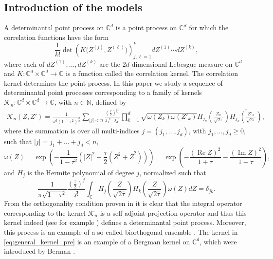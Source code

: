 \documentclass[%
 jmp,
cp,  %
 amsmath,amsthm,amssymb,%
 reprint,%
onecolumn]{revtex4-2}
\renewcommand{\Re}{\operatorname{Re}}
\renewcommand{\Im}{\operatorname{Im}}
\begin{document}
\subsection{Introduction of the models}
A determinantal point process on $\mathbb C^d$ is a point process on $\mathbb C^d$  for which the correlation functions have the form 
$$
    \frac{1}{k!} \det \left(K(Z^{(j)},{Z^{(\ell)})} \right)_{j,\ell=1}^{k} dZ^{(1)} \cdots d Z^{(k)},
$$
where each of $d Z^{(1)}, \ldots, d Z^{(k)}$ are the $2d$ dimensional Lebesgue measure on $\mathbb C^d$ and $K: \mathbb C^d \times \mathbb C^d \to \mathbb C$ is a function called the correlation kernel. The correlation kernel determines the point process.  
In this paper we study a sequence of determinantal point processes corresponding to a family of kernels $\mathcal K_n: \mathbb C^d \times \mathbb C^d \to \mathbb C$, with $n \in \mathbb N$, defined by  
\begin{align} \label{eq:general_kernel_pre}
\mathcal K_n(Z,Z') = \frac{1}{\pi^d (1-\tau^2)^\frac{d}{2}} \sum_{\lvert j\rvert < n} \frac{\left(\frac{\tau}{2}\right)^{\lvert j\rvert}}{j_1!\cdots j_d!} \prod_{k=1}^d \sqrt{\omega(Z_{k}) \omega(Z'_{k})} H_{j_k} \left({\frac{Z_{k}}{\sqrt{2 \tau}}} \right)\overline{ H_{j_k}\left({\frac{Z'_{k}}{\sqrt{2 \tau}}} \right)},
\end{align}
where the summation is over all multi-indices $j=(j_1,\ldots,j_d)$, with $j_1, \ldots, j_d\geq 0$, such that $\lvert j \rvert = j_1+\ldots+j_d<n$,
\begin{equation}
    \omega(Z) = \exp\left(-\frac{1}{1-\tau^2} \left(|Z|^2-\frac{\tau}{2} (Z^2+\overline Z ^2)\right)\right)= \exp\left(-\frac{(\Re Z)^2}{1+\tau}-\frac{(\Im Z)^2}{1-\tau} \right),
\end{equation}
and $H_j$ is the Hermite polynomial of degree $j$, normalized such that 
\begin{equation} \label{eq:defHermitePolyNormalization}
    \frac{1}{\pi \sqrt{1-\tau^2}}\frac{\left(\frac{\tau}{2}\right)^j}{j!} \int_{\mathbb C} H_j \left({\frac{Z}{\sqrt{2 \tau}}}  \right) \overline{H_k\left({\frac{Z}{\sqrt{2 \tau}}} \right)}  \omega(Z) dZ = \delta_{jk}.
\end{equation}
From the orthogonality condition 
proven in \cite{EvM,PdF}
it is clear that the integral operator corresponding to the kernel $\mathcal K_n$ is a self-adjoint projection operator and thus this  kernel indeed (see for example \cite{Sosh}) defines a determinantal point process. Moreover, this process is an example of a so-called biorthogonal ensemble \cite{Bor}. The kernel in \eqref{eq:general_kernel_pre} is an example of a Bergman kernel on $\mathbb C^d$,  which were introduced by Berman \cite{Berman1}.  
\end{document}
